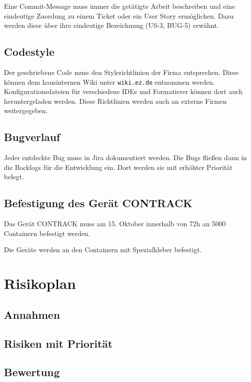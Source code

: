 Eine Commit-Message muss immer die getätigte Arbeit beschreiben und eine eindeutige Zuordung zu einem Ticket oder ein User Story ermöglichen. Dazu werden diese über ihre eindeutige Bezeichnung (US-3, BUG-5) erwähnt.
\subsection{Codestyle}
Der geschriebene Code muss den Stylerichtlinien der Firma entsprechen. Diese können dem hausinternen Wiki unter \texttt{wiki.ez.de} entnommen werden. Konfigurationsdateien für verschiedene IDEs und Formatierer können dort auch heruntergeladen werden. Diese Richtlinien werden auch an externe Firmen weitergegeben. 
\subsection{Bugverlauf}
Jeder entdeckte Bug muss in Jira dokumentiert werden. Die Bugs fließen dann in die Backlogs für die Entwicklung ein. Dort werden sie mit erhöhter Priorität belegt.


\subsection{Befestigung des Gerät CONTRACK}
Das Gerät CONTRACK muss am 15. Oktober innerhalb von 72h an 5000 Containern befestigt werden.

Die Geräte werden an den Containern mit Spezialkleber befestigt.





\section{Risikoplan}
\subsection{Annahmen} %


\subsection{Risiken mit Priorität} %


\subsection{Bewertung } %


